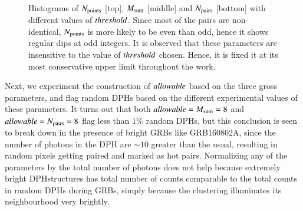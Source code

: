 \begin{figure}
\begin{center}
\end{center}
\caption[Histograms of $\N$, $\M$ and $\Np$ with different values of $\thr$]{Histograms of $\N$ [top], $\M$ [middle] and $\Np$ [bottom] with different values of $\thr$. Since most of the pairs are non-identical, $\N$ is more likely to be even than odd, hence it shows regular dips at odd integers. It is observed that these parameters are insensitive to the value of $\thr$ chosen. Hence, it is fixed it at its most conservative upper limit throughout the work.
\label{fig:threshold_insensitiveness}}
\end{figure}


Next, we experiment the construction of $allowable$ based on the three gross parameters, and flag random DPHs based on the different experimental values of these parameters. It turns out that both $allowable = M_{\rm{sum}} = 8$ and $allowable = N_{\rm{pairs}} = 8$ flag less than $1\%$ random DPHs, but this conclusion is seen to break down in the presence of bright GRBs like GRB160802A, since the number of photons in the DPH are  $\sim 10$ greater than the usual, resulting in random pixels getting paired and marked as hot pairs. Normalizing any of the parameters by the total number of photons does not help because extremely bright DPHstructures has total number of counts comparable to the total counts in random DPHs during GRBs, simply because the clustering illuminates its neighbourhood very brightly.




